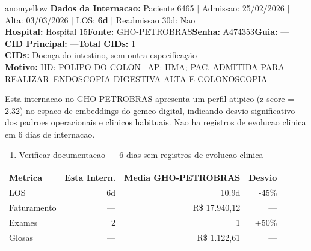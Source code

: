 \documentclass[a4paper,10pt]{article}
\begin{document}
\begin{anomalycard}[Internacao 166766 | GHO-PETROBRAS | MODERADO (z=2.32)]{anomyellow}
\textbf{Dados da Internacao:} Paciente 6465 $\mid$ Admissao: 25/02/2026 $\mid$ Alta: 03/03/2026 $\mid$ LOS: \textbf{6d} $\mid$ Readmissao 30d: Nao\\
\textbf{Hospital:} Hospital 15\quad\textbf{Fonte:} GHO-PETROBRAS\quad\textbf{Senha:} A474353\quad\textbf{Guia:} ---\\
\textbf{CID Principal:} {\small ---}\quad\textbf{Total CIDs:} 1\\

\textbf{CIDs:} {\scriptsize Doença do intestino, sem outra especificação}\\

\textbf{Motivo:} {\scriptsize HD: POLIPO DO COLON  AP:  HMA; PAC. ADMITIDA PARA REALIZAR ENDOSCOPIA DIGESTIVA ALTA E COLONOSCOPIA}\\

\vspace{2pt}\begin{tcolorbox}[colback=severityred!20,colframe=anomyellow,title={\textbf{Interpretacao de Negocio}},fonttitle=\bfseries\small,left=4pt,right=4pt,top=3pt,bottom=3pt]
{\small Esta internacao no GHO-PETROBRAS apresenta um perfil atipico (z-score = 2.32) no espaco de embeddings do gemeo digital, indicando desvio significativo dos padroes operacionais e clinicos habituais. Nao ha registros de evolucao clinica em 6 dias de internacao.}
\end{tcolorbox}
\begin{tcolorbox}[colback=severityyellow!30,colframe=anomorange,title={\textbf{Recomendacoes Especificas}},fonttitle=\bfseries\small,left=4pt,right=4pt,top=3pt,bottom=3pt]
\begin{enumerate}[nosep,leftmargin=16pt]
\item {\small Verificar documentacao --- 6 dias sem registros de evolucao clinica}
\end{enumerate}
\end{tcolorbox}
\begin{center}\begin{tabular}{l r r r}\toprule\textbf{Metrica} & \textbf{Esta Intern.} & \textbf{Media GHO-PETROBRAS} & \textbf{Desvio} \\\midrule
LOS & 6d & 10.9d & -45\% \\
Faturamento & --- & R\$ 17.940,12 & --- \\
Exames & 2 & 1 & \textcolor{anomorange}{+50\%} \\
Glosas & --- & R\$ 1.122,61 & --- \\
\bottomrule\end{tabular}\end{center}


\end{anomalycard}
\end{document}
